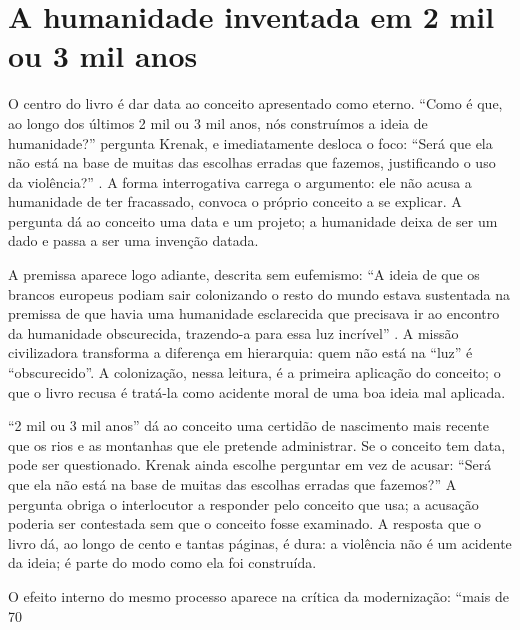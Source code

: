 \documentclass[12pt]{article}
\begin{document}
\section{A humanidade inventada em 2 mil ou 3 mil anos}

O centro do livro é dar data ao conceito apresentado como eterno. ``Como é que, ao longo dos últimos 2 mil ou 3 mil anos, nós construímos a ideia de humanidade?'' pergunta Krenak, e imediatamente desloca o foco: ``Será que ela não está na base de muitas das escolhas erradas que fazemos, justificando o uso da violência?'' \cite[p. 11]{krenak2019}. A forma interrogativa carrega o argumento: ele não acusa a humanidade de ter fracassado, convoca o próprio conceito a se explicar. A pergunta dá ao conceito uma data e um projeto; a humanidade deixa de ser um dado e passa a ser uma invenção datada.

A premissa aparece logo adiante, descrita sem eufemismo: ``A ideia de que os brancos europeus podiam sair colonizando o resto do mundo estava sustentada na premissa de que havia uma humanidade esclarecida que precisava ir ao encontro da humanidade obscurecida, trazendo-a para essa luz incrível'' \cite[p. 11]{krenak2019}. A missão civilizadora transforma a diferença em hierarquia: quem não está na ``luz'' é ``obscurecido''. A colonização, nessa leitura, é a primeira aplicação do conceito; o que o livro recusa é tratá-la como acidente moral de uma boa ideia mal aplicada.

``2 mil ou 3 mil anos'' dá ao conceito uma certidão de nascimento mais recente que os rios e as montanhas que ele pretende administrar. Se o conceito tem data, pode ser questionado. Krenak ainda escolhe perguntar em vez de acusar: ``Será que ela não está na base de muitas das escolhas erradas que fazemos?'' A pergunta obriga o interlocutor a responder pelo conceito que usa; a acusação poderia ser contestada sem que o conceito fosse examinado. A resposta que o livro dá, ao longo de cento e tantas páginas, é dura: a violência não é um acidente da ideia; é parte do modo como ela foi construída.

O efeito interno do mesmo processo aparece na crítica da modernização: ``mais de 70%
\end{document}

